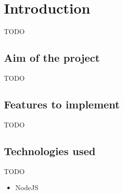 \chapter{Introduction}
\label{chapter:introduction}
TODO

\section{Aim of the project}
TODO

\section{Features to implement}
TODO

\section{Technologies used}
TODO
\begin{itemize}
    \item NodeJS
\end{itemize}
